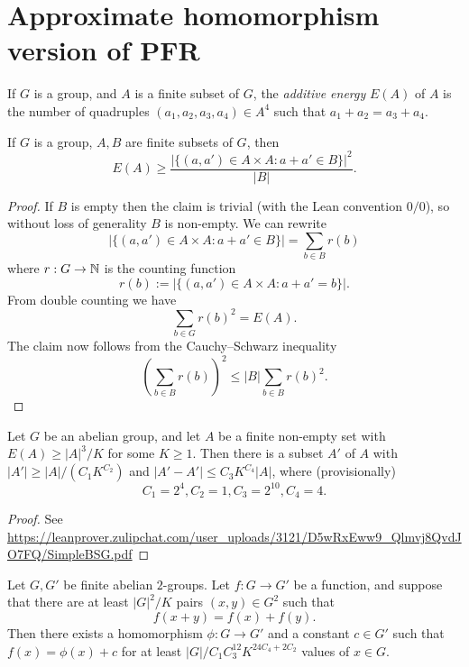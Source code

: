 \chapter{Approximate homomorphism version of PFR}

\begin{definition}\label{energy-def}\leanok  If $G$ is a group, and $A$ is a finite subset of $G$, the \emph{additive energy} $E(A)$ of $A$ is the number of quadruples $(a_1,a_2,a_3,a_4) \in A^4$ such that $a_1+a_2 = a_3+a_4$.
\end{definition}

\begin{lemma}\label{cs-bound}\leanok  If $G$ is a group, $A,B$ are finite subsets of $G$, then
$$ E(A) \geq \frac{|\{ (a,a') \in A \times A: a+a' \in B \}|^2}{|B|}.$$
\end{lemma}

\begin{proof}\leanok  If $B$ is empty then the claim is trivial (with the Lean convention $0/0$), so without loss of generality $B$ is non-empty.  We can rewrite
$$ |\{ (a,a') \in A \times A: a+a' \in B \}| = \sum_{b \in B} r(b)$$
where $r: G \to \mathbb{N}$ is the counting function
$$ r(b) := |\{ (a,a') \in A \times A: a+a' = b \}|.$$
From double counting we have
$$ \sum_{b \in G} r(b)^2 = E(A).$$
The claim now follows from the Cauchy--Schwarz inequality
$$ (\sum_{b \in B} r(b))^2 \leq |B| \sum_{b \in B} r(b)^2.$$
\end{proof}

\begin{lemma}\label{bsg}\leanok Let $G$ be an abelian group, and let $A$ be a finite non-empty set with $E(A) \geq |A|^3 / K$ for some $K \geq 1$.  Then there is a subset $A'$ of $A$ with $|A'| \geq |A| / (C_1 K^{C_2})$ and $|A'-A'| \leq C_3 K^{C_4} |A|$, where (provisionally)
$$ C_1 = 2^4, C_2 = 1, C_3 = 2^{10}, C_4 = 4.$$
\end{lemma}

\begin{proof} See \url{https://leanprover.zulipchat.com/user_uploads/3121/D5wRxEww9_Qlmvj8QvdJO7FQ/SimpleBSG.pdf}
\end{proof}

\begin{theorem}\label{approx-hom-pfr}\leanok Let $G,G'$ be finite abelian $2$-groups.
  Let $f: G \to G'$ be a function, and suppose that there are at least $|G|^2 / K$ pairs $(x,y) \in G^2$ such that
$$ f(x+y) = f(x) + f(y).$$
Then there exists a homomorphism $\phi: G \to G'$ and a constant $c \in G'$
such that $f(x) = \phi(x)+c$ for at least $|G| / C_1 C_3^{12}
K^{24C_4 + 2C_2}$ values of $x \in G$.
\end{theorem}

